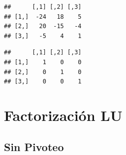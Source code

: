 \documentclass[
]{book}
\begin{document}
\begin{verbatim}
##      [,1] [,2] [,3]
## [1,]  -24   18    5
## [2,]   20  -15   -4
## [3,]   -5    4    1
\end{verbatim}

\begin{verbatim}
##      [,1] [,2] [,3]
## [1,]    1    0    0
## [2,]    0    1    0
## [3,]    0    0    1
\end{verbatim}

\section{Factorización LU}\label{factorizaciuxf3n-lu}

\subsection{Sin Pivoteo}\label{sin-pivoteo}
\end{document}
